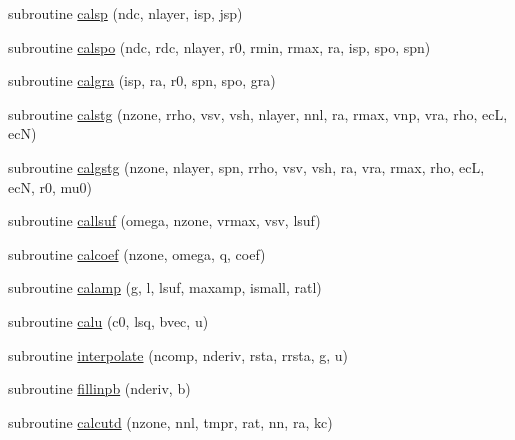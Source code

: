 \begin{DoxyCompactItemize}
\item 
subroutine \hyperlink{others_8f90_a491a1809512f4d0c9b7deb0ebc03476b}{calsp} (ndc, nlayer, isp, jsp)
\item 
subroutine \hyperlink{others_8f90_a7a7938fb982c4a633077c535d7b7a1cf}{calspo} (ndc, rdc, nlayer, r0, rmin, rmax, ra, isp, spo, spn)
\item 
subroutine \hyperlink{others_8f90_ae1038c36002aab3fa3538be92616f37c}{calgra} (isp, ra, r0, spn, spo, gra)
\item 
subroutine \hyperlink{others_8f90_a02ab9b8cf196b1fc00efd15f21280afb}{calstg} (nzone, rrho, vsv, vsh, nlayer, nnl, ra, rmax, vnp, vra, rho, ec\-L, ec\-N)
\item 
subroutine \hyperlink{others_8f90_a738d75ad0f6cd86a3a51fcccc4864c55}{calgstg} (nzone, nlayer, spn, rrho, vsv, vsh, ra, vra, rmax, rho, ec\-L, ec\-N, r0, mu0)
\item 
subroutine \hyperlink{others_8f90_a0121e57fd51bf2812b3d1e5505a203f3}{callsuf} (omega, nzone, vrmax, vsv, lsuf)
\item 
subroutine \hyperlink{others_8f90_a529ec330ba01f0ab2f975a410c09d432}{calcoef} (nzone, omega, q, coef)
\item 
subroutine \hyperlink{others_8f90_a104362b0c91ac4804228b852c39f926f}{calamp} (g, l, lsuf, maxamp, ismall, ratl)
\item 
subroutine \hyperlink{others_8f90_a992c21fefe0ce478647b40e5f006b774}{calu} (c0, lsq, bvec, u)
\item 
subroutine \hyperlink{others_8f90_a04a78632138cfc56c15a28429a22ab7a}{interpolate} (ncomp, nderiv, rsta, rrsta, g, u)
\item 
subroutine \hyperlink{others_8f90_a637acae66901e94f0b90107bdfd2bc22}{fillinpb} (nderiv, b)
\item 
subroutine \hyperlink{others_8f90_a01e211f5aac4638ab039fec949faca59}{calcutd} (nzone, nnl, tmpr, rat, nn, ra, kc)
\end{DoxyCompactItemize}


